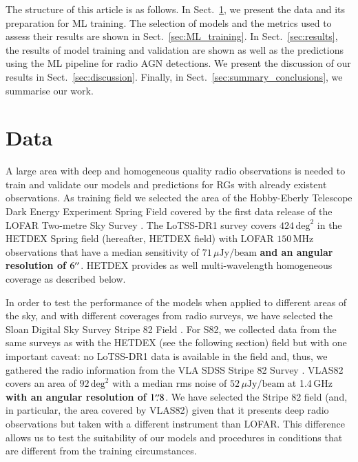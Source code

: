 \documentclass{aa}
\begin{document}
The structure of this article is as follows. In Sect.~\ref{sec:data}, we present the data and its preparation for ML training. The selection of models and the metrics used to assess their results are shown in Sect.~\ref{sec:ML_training}. In Sect.~\ref{sec:results}, the results of model training and validation are shown as well as the predictions using the ML pipeline for radio AGN detections. We present the discussion of our results in Sect.~\ref{sec:discussion}. Finally, in Sect.~\ref{sec:summary_conclusions}, we summarise our work.

\section{Data}\label{sec:data}

A large area with deep and homogeneous quality radio observations is needed to train and validate our models and predictions for RGs with already existent observations. As training field we selected the area of the Hobby-Eberly Telescope Dark Energy Experiment Spring Field \citep[HETDEX;][]{2008ASPC..399..115H} covered by the first data release of the LOFAR Two-metre Sky Survey \citep[LoTSS-DR1;][]{2019A&A...622A...1S}. The LoTSS-DR1 survey covers $424\, \mathrm{deg}^{2}$ in the HETDEX Spring field (hereafter, HETDEX field) with LOFAR \citep{2013A&A...556A...2V} $150\, \mathrm{MHz}$ observations that have a median sensitivity of $71\, \mu\mathrm{Jy}/\mathrm{beam}$ \textbf{and an angular resolution of $6^{\prime\prime}$}. HETDEX provides as well multi-wavelength homogeneous coverage as described below.

In order to test the performance of the models when applied to different areas of the sky, and with different coverages from radio surveys, we have selected the Sloan Digital Sky Survey \citep[SDSS,][]{2000AJ....120.1579Y} Stripe 82 Field \citep[S82,][]{2014ApJ...794..120A, 2014ApJS..213...12J}. For S82, we collected data from the same surveys as with the HETDEX (see the following section) field but with one important caveat: no LoTSS-DR1 data is available in the field and, thus, we gathered the radio information from the VLA SDSS Stripe 82 Survey \citep[VLAS82;][]{2011AJ....142....3H}. VLAS82 covers an area of $92\, \mathrm{deg}^{2}$ with a median rms noise of $52\,\mu\mathrm{Jy}/\mathrm{beam}$ at 1.4$\,$GHz \textbf{with an angular resolution of $1\overset{\prime\prime}{.} 8$}. We have selected the Stripe 82 field (and, in particular, the area covered by VLAS82) given that it presents deep radio observations but taken with a different instrument than LOFAR. This difference allows us to test the suitability of our models and procedures in conditions that are different from the training circumstances.
\end{document}
